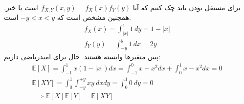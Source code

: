 \\
برای مستقل بودن باید چک کنیم که آیا
$f_{X,Y}(x, y) = f_X(x)f_Y(y)$
است یا خیر. همچنین مشخص است که
$-y < x < y$
است.
\begin{gather*}
    f_X(x) = \int_{|x|}^1 1 ~ dy = 1 - |x|\\
    f_Y(y) = \int_{-y}^y 1 ~ dx = 2y
\end{gather*}
پس متغیر‌ها وابسته هستند. حال برای امیدریاضی داریم:
\begin{gather*}
    \mathbb{E} [X] = \int_{-1}^1 x(1 - |x|) dx = \int_{-1}^0 x + x^2 dx + \int_0^1 x - x^2 dx = 0\\
    \mathbb{E} [XY] = \int_{0}^{1} \int_{-y}^{+y} xy ~ dxdy = \int_{0}^{1} 0 ~ dy = 0\\
    \implies \mathbb{E} [X] \mathbb{E} [Y] = \mathbb{E} [XY]
\end{gather*}